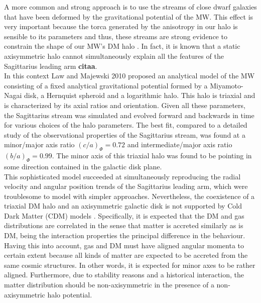 A more common and strong approach is to use the streams of close dwarf galaxies that have been deformed by the gravitational potential of the MW. 
This effect is very important because the torca generated by the anisotropy in our halo is sensible to its parameters and thus, these streams are strong evidence to constrain the shape of our MW's DM halo \cite{See Law-Majewski references}. 
In fact, it is known that a static axisymmetric halo cannot simultaneously explain all the features of the Sagittarius leading arm \textbf{citaa}. \\

In this context Law and Majewski 2010 proposed an analytical model of the MW consisting of a fixed analytical gravitational potential formed by a Miyamoto-Nagai \cite{Miyamoto-Nagai 1985} disk, a Hernquist spheroid and a logarithmic halo. 
This halo is triaxial and is characterized by its axial ratios and orientation. 
Given all these parameters, the Sagittarius stream was simulated and evolved forward and backwards in time for various choices of the halo parameters. 
The best fit, compared to a detailed study of the observational properties of the Sagittarius stream, was found at a minor/major axis ratio $(c/a)_{\Phi}=0.72$ and intermediate/major axis ratio $(b/a)_{\Phi}=0.99$. The minor axis of this triaxial halo was found to be pointing in some direction contained in the galactic disk plane. \\

This sophisticated model succeeded at simultaneously reproducing the radial velocity and angular position trends of the Sagittarius leading arm, which were troublesome to model with simpler approaches. 
Nevertheless, the coexistence of a triaxial DM halo and an axisymmetric galactic disk is not supported by Cold Dark Matter (CDM) models \cite{Debattista et al. 2008}. 
Specifically, it is expected that the DM and gas distributions are correlated in the sense that matter is accreted similarly as is DM, being the interaction properties the principal difference in the behaviour. 
Having this into account, gas and DM must have aligned angular momenta to certain extent because all kinds of matter are expected to be accreted from the same cosmic structures. 
In other words, it is expected for minor axes to be rather aligned. 
Furthermore, due to stability reasons and a historical interaction, the matter distribution should be non-axisymmetric in the presence of a non-axisymmetric halo potential.\\


